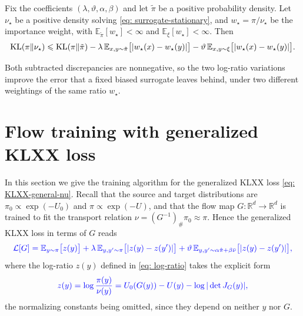 \documentclass{article}
\begin{document}
\begin{theorem}
\label{thm: accuracy}
Fix {\color{blue}the coefficients $(\lambda,\vartheta,\alpha,\beta)$} and let $\tilde\pi$ be a positive probability density. Let $\nu_\star$ be a positive density solving \eqref{eq: surrogate-stationary}, {\color{blue}and $w_\star = \pi/\nu_\star$ be the importance weight}, with $\mathbb E_{\tilde\pi}[w_\star]<\infty$ and $\mathbb E_{\xi}[w_\star]<\infty$. Then
\begin{equation}
	\mathrm{KL}(\pi\|\nu_\star) \leqslant \mathrm{KL}(\pi\|\tilde\pi)
	- \lambda\,\mathbb E_{x,y\sim\tilde\pi}\bigl[|w_\star(x)-w_\star(y)|\bigr]
	- \vartheta\,\mathbb E_{x,y\sim\xi}\bigl[|w_\star(x)-w_\star(y)|\bigr] .
	\label{eq: accuracy-bound}
\end{equation}
\end{theorem}
Both subtracted discrepancies are nonnegative, so the two log-ratio variations improve the error that a fixed biased surrogate leaves behind, under two different weightings of the same ratio $w_\star$.

\section{Flow training with generalized KLXX loss}
\label{sec: training}

In this section we give the training algorithm for the generalized KLXX loss {\color{blue}\eqref{eq: KLXX-general-nu}}. Recall that the source and target distributions are $\pi_0\propto \exp(-U_0)$ and $\pi\propto \exp(-U)$, and that the flow map $G:\mathbb R^d\to\mathbb R^d$ is trained to fit the transport relation {\color{blue}$\nu=(G^{-1})_{\#}\pi_0\approx\pi$}. {\color{blue}Hence the generalized KLXX loss in terms of $G$ reads}
\begin{equation}
	\color{blue}\mathcal L[G] = \mathbb E_{y\sim\pi}\big[z(y)\big] +  \lambda\, \mathbb E_{y,y'\sim\pi}\big[|z(y)-z(y')|\big] + \vartheta\, \mathbb E_{y,y'\sim \alpha\hat\pi+\beta\bar\nu}\big[|z(y)-z(y')|\big],
	\label{eq: KLXX-general}
\end{equation}
{\color{blue}where the log-ratio $z(y)$ defined in \eqref{eq: log-ratio} takes the explicit form}
\begin{equation*}
	\color{blue}z(y) = \log\frac{\pi(y)}{\nu(y)} = U_0(G(y)) - U(y) - \log|\det J_G(y)|,
\end{equation*}
{\color{blue}the normalizing constants being omitted, since they depend on neither $y$ nor $G$.}
\end{document}
